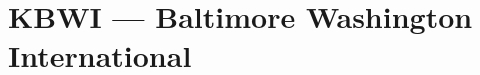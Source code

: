 \documentclass[fontsize=10pt, paper=letter]{article}
\newenvironment{inset}[1]
  {\par\begin{mdframed}[linewidth=0.5pt]%
    \begin{list}{}{\leftmargin=1cm
                   \labelwidth=\leftmargin}\item[\raisebox{-0.0em}{\smash{\large#1}}]\null\vspace{\fill}\par\tiny}
  {\vspace{\fill}\end{list}\end{mdframed}\par}
\newcommand*{\TakeFourierOrnament}[1]{{%
\fontencoding{U}\fontfamily{futs}\selectfont\char#1}}
\newcommand*{\danger}{\TakeFourierOrnament{66}}
\newcommand{\IFRInitialAlt}{---}
\newcommand{\VFRInitialAlt}{---}
\newcommand{\Airport}[3]{
\section{#1}
\renewcommand{\IFRInitialAlt}{#2}
\renewcommand{\VFRInitialAlt}{#3}
}
\begin{document}
%
%
%
%
%
%
%
%
%
%
%

\clearpage

\Airport{KBWI --- Baltimore Washington International}{4000}{2000}
\end{document}
